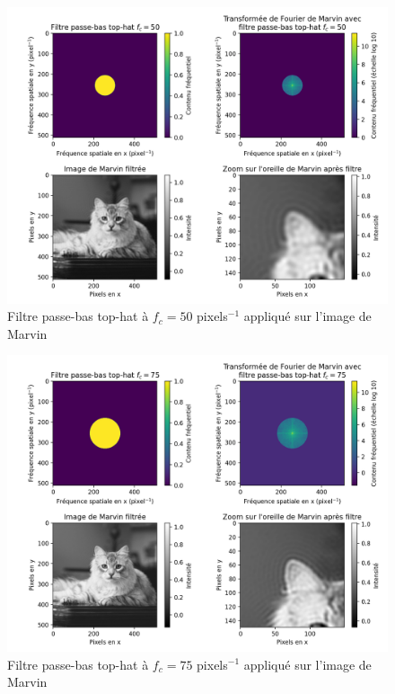 \documentclass[11pt,letterpaper]{article}
\begin{document}
\begin{figure}[H]
  \centering
  \includegraphics[scale=0.7]{marvin_post_filter_fc_50.png}
  \caption{Filtre passe-bas top-hat à $f_c = 50$ pixels$^{-1}$ appliqué sur l'image de Marvin}
  \label{fc50hat}
\end{figure}

\begin{figure}[H]
  \centering
  \includegraphics[scale=0.7]{marvin_post_filter_fc_75.png}
  \caption{Filtre passe-bas top-hat à $f_c = 75$ pixels$^{-1}$ appliqué sur l'image de Marvin}
  \label{fc75}
\end{figure}
\end{document}
